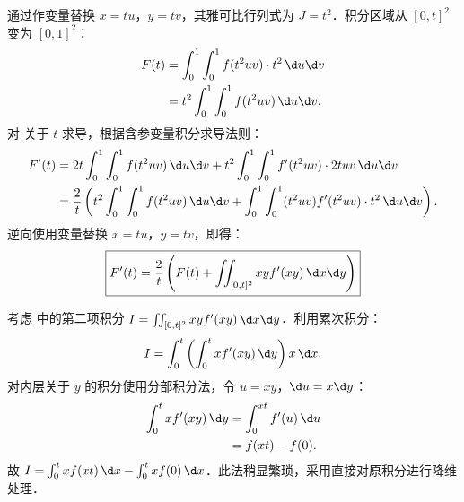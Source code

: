 \begin{myproof}
    通过作变量替换 $x = tu$，$y = tv$，其雅可比行列式为 $J = t^2$．积分区域从 $[0,t]^2$ 变为 $[0,1]^2$：
    \begin{equation}
        \begin{aligned}
            F(t) & = \int_0^1 \int_0^1 f(t^2 uv) \cdot t^2 \, \d u \d v \\
                 & = t^2 \int_0^1 \int_0^1 f(t^2 uv) \, \d u \d v.
        \end{aligned} \label{eq:F-t-form}
    \end{equation}
    对  关于 $t$ 求导，根据含参变量积分求导法则：
    \begin{equation}
        \begin{aligned}
            F'(t) & = 2t \int_0^1 \int_0^1 f(t^2 uv) \, \d u \d v + t^2 \int_0^1 \int_0^1 f'(t^2 uv) \cdot 2t uv \, \d u \d v                                 \\
                  & = \frac{2}{t} \left( t^2 \int_0^1 \int_0^1 f(t^2 uv) \, \d u \d v + \int_0^1 \int_0^1 (t^2 uv) f'(t^2 uv) \cdot t^2 \, \d u \d v \right).
        \end{aligned}
    \end{equation}
    逆向使用变量替换 $x = tu$，$y = tv$，即得：
    \begin{equation}
        \boxed{F'(t) = \frac{2}{t} \left( F(t) + \iint_{[0,t]^2} xy f'(xy) \, \d x \d y \right)}
    \end{equation}

    考虑  中的第二项积分 $I = \iint_{[0,t]^2} xy f'(xy) \, \d x \d y$．利用累次积分：
    \begin{equation}
        I = \int_0^t \left( \int_0^t x f'(xy) \, \d y \right) x \, \d x.
    \end{equation}
    对内层关于 $y$ 的积分使用分部积分法，令 $u = xy$，$ \d u = x \d y$：
    \begin{equation}
        \begin{aligned}
            \int_0^t x f'(xy) \, \d y & = \int_0^{xt} f'(u) \, \d u \\
                                      & = f(xt) - f(0).
        \end{aligned}
    \end{equation}
    故 $I = \int_0^t x f(xt) \, \d x - \int_0^t x f(0) \, \d x$．此法稍显繁琐，采用直接对原积分进行降维处理．


\end{myproof}
